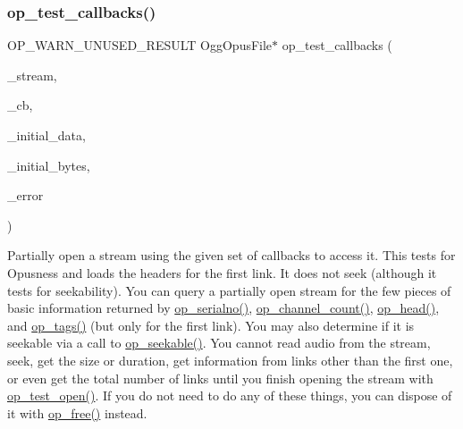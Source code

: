 \subsubsection{\texorpdfstring{op\_test\_callbacks()}{op\_test\_callbacks()}}
{\footnotesize\ttfamily O\+P\+\_\+\+W\+A\+R\+N\+\_\+\+U\+N\+U\+S\+E\+D\+\_\+\+R\+E\+S\+U\+LT Ogg\+Opus\+File$\ast$ op\+\_\+test\+\_\+callbacks (\begin{DoxyParamCaption}\item[{\mbox{\hyperlink{_s_d_l__opengles2__gl2ext_8h_ae5d8fa23ad07c48bb609509eae494c95}{void}} $\ast$}]{\+\_\+stream,  }\item[{const \mbox{\hyperlink{struct_opus_file_callbacks}{Opus\+File\+Callbacks}} $\ast$}]{\+\_\+cb,  }\item[{const unsigned char $\ast$}]{\+\_\+initial\+\_\+data,  }\item[{size\+\_\+t}]{\+\_\+initial\+\_\+bytes,  }\item[{int $\ast$}]{\+\_\+error }\end{DoxyParamCaption})}

Partially open a stream using the given set of callbacks to access it. This tests for Opusness and loads the headers for the first link. It does not seek (although it tests for seekability). You can query a partially open stream for the few pieces of basic information returned by \mbox{\hyperlink{group__stream__info_ga41992ce6f066e07609e5fe2ccd961f40}{op\+\_\+serialno()}}, \mbox{\hyperlink{group__stream__info_ga42c829e67c0ce8359bfbfc31a45c04f4}{op\+\_\+channel\+\_\+count()}}, \mbox{\hyperlink{group__stream__info_gabae95dfa8a278a305213332e295443bb}{op\+\_\+head()}}, and \mbox{\hyperlink{group__stream__info_ga4b9b8b62a9fb04aee64c288e106a4822}{op\+\_\+tags()}} (but only for the first link). You may also determine if it is seekable via a call to \mbox{\hyperlink{group__stream__info_ga9272a4a6ac9e01fbc549008f5ff58b4c}{op\+\_\+seekable()}}. You cannot read audio from the stream, seek, get the size or duration, get information from links other than the first one, or even get the total number of links until you finish opening the stream with \mbox{\hyperlink{group__stream__open__close_ga7b7f1c778ce6ced5538ce66e292d894d}{op\+\_\+test\+\_\+open()}}. If you do not need to do any of these things, you can dispose of it with \mbox{\hyperlink{group__stream__open__close_gaf494ef9aa761647d8167c49507560d1c}{op\+\_\+free()}} instead.

